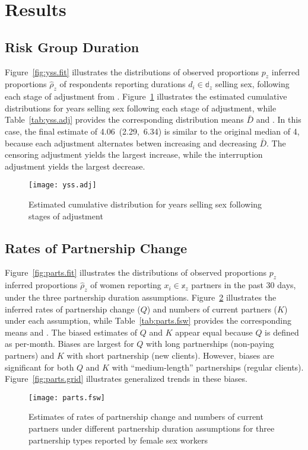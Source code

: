 \section{Results}
\subsection{Risk Group Duration}\label{res.yss}
Figure~\ref{fig:yss.fit} illustrates the distributions of
observed proportions $p_z$ \vs inferred proportions $\hat{\rho}_z$ of respondents
reporting durations $d_i \in \mathbb{d}_z$ selling sex,
following each stage of adjustment from .
Figure~\ref{fig:yss.adj} illustrates
the estimated cumulative distributions for years selling sex following each stage of adjustment,
while Table~\ref{tab:yss.adj} provides the corresponding distribution means $\bar{D}$ and \ci.
In this case, the final estimate of 4.06~(2.29,~6.34) is similar to the original median of 4,
because each adjustment alternates betwen increasing and decreasing $\bar{D}$.
The censoring adjustment yields the largest increase, while
the interruption adjustment yields the largest decrease.
\begin{figure}[h]
  \centering\texttt{[image: yss.adj]}
  \caption{Estimated cumulative distribution for years selling sex
    following stages of adjustment}
  \label{fig:yss.adj}
\end{figure}
\subsection{Rates of Partnership Change}\label{res.parts}
Figure~\ref{fig:parts.fit} illustrates the distributions of
observed proportions $p_z$ \vs inferred proportions $\hat{\rho}_z$ of women
reporting $x_i \in \mathbb{x}_z$ partners in the past 30 days,
under the three partnership duration assumptions.
Figure~\ref{fig:parts.fsw} illustrates the inferred
rates of partnership change ($Q$) and numbers of current partners ($K$) under each assumption,
while Table~\ref{tab:parts.fsw} provides the corresponding means and \ci.
The biased estimates of $Q$ and $K$ appear equal because $Q$ is defined as per-month.
Biases are largest for
$Q$ with long partnerships (\eg non-paying partners) and
$K$ with short partnership (\eg new clients).
However, biases are significant for
both $Q$ and $K$ with ``medium-length'' partnerships (\eg regular clients).
Figure~\ref{fig:parts.grid} illustrates generalized trends in these biases.
\begin{figure}
  \centering\texttt{[image: parts.fsw]}
  \caption{Estimates of rates of partnership change and numbers of current partners
    under different partnership duration assumptions
    for three partnership types reported by female sex workers}
  \label{fig:parts.fsw}
\end{figure}
